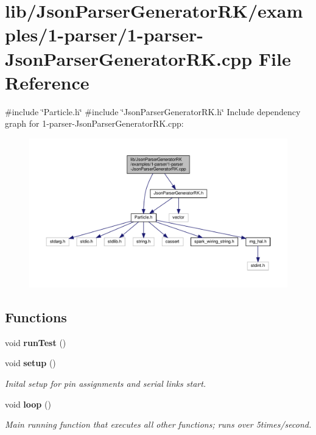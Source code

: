 \section{lib/\+Json\+Parser\+Generator\+R\+K/examples/1-\/parser/1-\/parser-\/\+Json\+Parser\+Generator\+RK.cpp File Reference}
\label{1-parser-_json_parser_generator_r_k_8cpp}
{\ttfamily \#include \char`\"{}Particle.\+h\char`\"{}}\newline
{\ttfamily \#include \char`\"{}Json\+Parser\+Generator\+R\+K.\+h\char`\"{}}\newline
Include dependency graph for 1-\/parser-\/\+Json\+Parser\+Generator\+RK.cpp\+:\nopagebreak
\begin{figure}[H]
\begin{center}
\leavevmode
\includegraphics[width=350pt]{1-parser-_json_parser_generator_r_k_8cpp__incl}
\end{center}
\end{figure}
\subsection*{Functions}
\begin{DoxyCompactItemize}
\item 
void \textbf{ run\+Test} ()
\item 
void \textbf{ setup} ()
\begin{DoxyCompactList}\small\item\em Inital setup for pin assignments and serial links start. \end{DoxyCompactList}\item 
void \textbf{ loop} ()
\begin{DoxyCompactList}\small\item\em Main running function that executes all other functions; runs over 5times/second. \end{DoxyCompactList}\end{DoxyCompactItemize}
